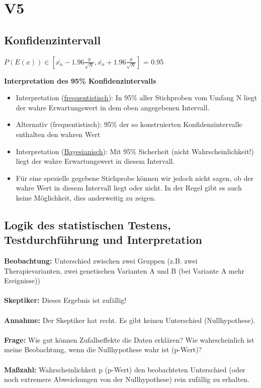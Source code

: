\section{V5}
\subsection{Konfidenzintervall}
$P(E(x)) \in \displaystyle [\bar{x_n} - 1.96 \frac{\hat{\sigma}}{\sqrt{N}}, \bar{x_n} + 1.96 \frac{\hat{\sigma}}{\sqrt{N}}]$ = 0.95

\textbf{Interpretation des 95\% Konfidenzintervalls}
\begin{itemize}
	\item Interpretation (\underline{frequentistisch}): In 95\% aller Stichproben vom Umfang N liegt der wahre Erwartungswert in dem oben angegebenen Intervall.
	\item Alternativ (frequentistisch): 95\% der so konstruierten Konfidenzintervalle enthalten den wahren Wert
	\item Interpretation (\underline{Bayesianisch}): Mit 95\% Sicherheit (nicht Wahrscheinlichkeit!) liegt der wahre Erwartungswert in diesem Intervall.
	\item Für eine spezielle gegebene Stichprobe können wir jedoch nicht sagen, ob der wahre Wert in diesem Intervall liegt oder nicht. In der Regel gibt es auch keine Möglichkeit, dies anderweitig zu zeigen.
\end{itemize}

\subsection{Logik des statistischen Testens, Testdurchführung und Interpretation}
\textbf{Beobachtung:} Unterschied zwischen zwei Gruppen (z.B. zwei Therapievarianten, zwei genetischen Varianten A und B (bei Variante A mehr Ereignisse))
\\\\
\textbf{Skeptiker:} Dieses Ergebnis ist zufällig!
\\\\
\textbf{Annahme:} Der Skeptiker hat recht. Es gibt keinen Unterschied (Nullhypothese).
\\\\
\textbf{Frage:} Wie gut können Zufallseffekte die Daten erklären? Wie wahrscheinlich ist meine Beobachtung, wenn die Nullhypothese wahr ist (p-Wert)?
\\\\
\textbf{Maßzahl:} Wahrscheinlichkeit p (p-Wert) den beobachteten Unterschied (oder noch extremere Abweichungen von der Nullhypothese) rein zufällig zu erhalten.


